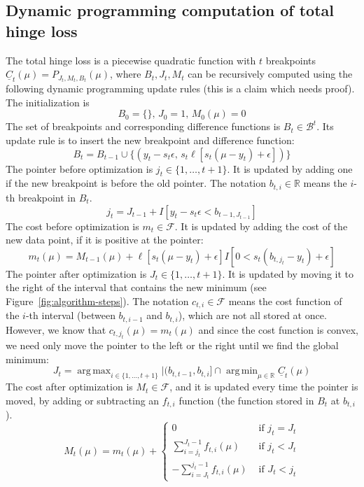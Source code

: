 \documentclass{article}
\DeclareMathOperator*{\argmin}{arg\,min}
\DeclareMathOperator*{\argmax}{arg\,max}
\begin{document}
\subsection{Dynamic programming computation of total hinge loss}
The total hinge loss is a piecewise quadratic function with $t$
breakpoints $\underline C_t(\mu)=P_{J_t,M_t,B_t}(\mu)$, where
$B_t,J_t,M_t$ can be recursively computed using the following dynamic
programming update rules (this is a claim which needs proof). The
initialization is
\begin{equation}
  \label{eq:init}
  B_0=\{\},\, J_0=1,\, M_0(\mu)=0
\end{equation}
The set of breakpoints and corresponding difference functions is
$B_t\in\mathcal B^t$. Its update rule is to insert the new breakpoint
and difference function:
\begin{equation}
  \label{eq:B_t}
  B_t=B_{t-1}\cup \{(y_t-s_t\epsilon,\, s_t\ell[s_t(\mu-y_t)+\epsilon])\}
\end{equation}
The pointer before optimization is $j_t\in\{1,\dots,t+1\}$. It is
updated by adding one if the new breakpoint is before the old
pointer. The notation $b_{t,i}\in\mathbb R$ means the $i$-th
breakpoint in $B_t$.
\begin{equation}
  \label{eq:j_t}
  j_t = J_{t-1} + I[y_t-s_t\epsilon < b_{t-1,J_{t-1}}]
\end{equation}
The cost before optimization is $m_t\in\mathcal F$. It is updated by adding the
cost of the new data point, if it is positive at the pointer:
\begin{equation}
  \label{eq:m_t}
  m_t(\mu) = M_{t-1}(\mu) + 
  \ell[s_t(\mu-y_t)+\epsilon]
  I[0<s_t(b_{t,j_t}-y_t)+\epsilon]
\end{equation}
The pointer after optimization is $J_t\in\{1,\dots,t+1\}$. It is
updated by moving it to the right of the interval that contains the
new minimum (see Figure~\ref{fig:algorithm-steps}). The notation
$c_{t,i}\in\mathcal F$ means the cost function of the $i$-th interval
(between $b_{t,i-1}$ and $b_{t,i}$), which are not all stored at
once. However, we know that $c_{t,j_t}(\mu)=m_t(\mu)$ and since the
cost function is convex, we need only move the pointer to the left or
the right until we find the global minimum:
\begin{equation}
  \label{eq:J_t}
  J_t = \argmax_{i\in\{1,\dots,t+1\}}
  |(b_{t,t-1}, b_{t,i}]\cap \argmin_{\mu\in\mathbb R}\underline C_t(\mu)
\end{equation}
The cost after optimization is $M_t\in\mathcal F$, and it is updated every time
the pointer is moved, by adding or subtracting an $f_{t,i}$ function
(the function stored in $B_t$ at $b_{t,i}$).
\begin{equation}
  \label{eq:M_t}
  M_t(\mu)=m_t(\mu) +
  \begin{cases}
    0 & \text{ if } j_t = J_t\\
    \sum_{i=j_t}^{J_t-1} f_{t,i}(\mu) & \text{ if } j_t < J_t\\
    -\sum_{i=J_t}^{j_t-1} f_{t,i}(\mu) & \text{ if } J_t < j_t
  \end{cases}
\end{equation}
\end{document}
